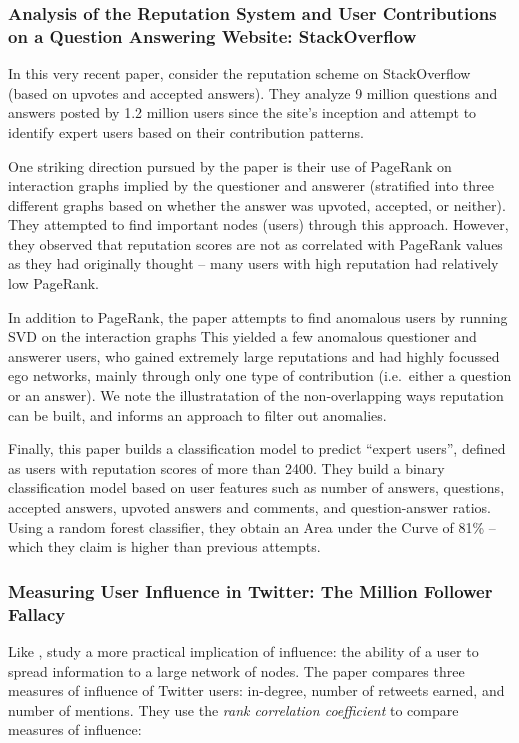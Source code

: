 \documentclass[10pt]{article}
\begin{document}
\subsubsection{Analysis of the Reputation System and User Contributions on a
  Question Answering Website: StackOverflow
  \citep{movshovitzanalysis}}

In this very recent paper, \citet{movshovitzanalysis} consider the reputation
scheme on StackOverflow (based on upvotes and accepted answers). They analyze 9
million questions and answers posted by 1.2 million users since the site's
inception and attempt to identify expert users based on their contribution
patterns.

One striking direction pursued by the paper is their use of PageRank on
interaction graphs implied by the questioner and answerer (stratified into three
different graphs based on whether the answer was upvoted, accepted, or neither).
They attempted to find important nodes (users) through this approach. However,
they observed that reputation scores are not as correlated with PageRank values
as they had originally thought -- many users with high reputation had
relatively low PageRank.

In addition to PageRank, the paper attempts to find anomalous users by running
SVD on the interaction graphs This yielded a few anomalous questioner and
answerer users, who gained extremely large reputations and had highly focussed
ego networks, mainly through only one type of contribution (i.e.\ either a
question or an answer). We note the illustratation of the non-overlapping ways
reputation can be built, and informs an approach to filter out anomalies.

Finally, this paper builds a classification model to predict ``expert users'',
defined as users with reputation scores of more than 2400. They build a
binary classification model based on user features such as number of answers,
questions, accepted answers, upvoted answers and comments, and question-answer
ratios. Using a random forest classifier, they obtain an Area
under the Curve of 81\% -- which they claim is higher than previous attempts.


\subsubsection{Measuring User Influence in Twitter: The Million Follower Fallacy
  \citep{cha2010measuring}}

Like \cite{bakshy2011everyone}, \citet{cha2010measuring} study a more practical
implication of influence: the ability of a user to spread information to a
large network of nodes. The paper compares three measures of influence of
Twitter users: in-degree, number of retweets earned, and number of mentions.
They use the \textit{rank correlation coefficient} to compare measures of
influence:
\end{document}
